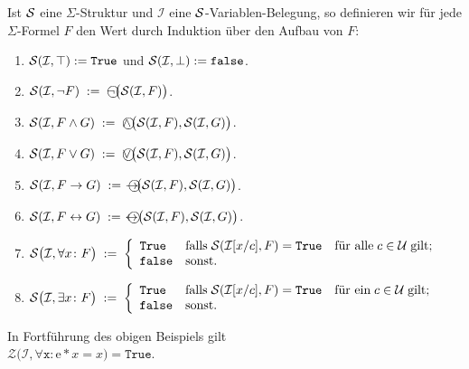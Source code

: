 \begin{Definition}
    Ist $\mathcal{S}$ eine $\Sigma$-Struktur und $\mathcal{I}$ eine $\mathcal{S}$-Variablen-Belegung,
    so definieren wir für jede $\Sigma$-Formel $F$ den Wert 
    durch Induktion über den Aufbau von $F$:
    \begin{enumerate}
    \item $\mathcal{S}(\mathcal{I},\top) := \mathtt{True}$ und $\mathcal{S}(\mathcal{I},\bot) := \mathtt{false}$.
    \item $\struct(\mathcal{I}, \neg F) \;:=\; \circneg\bigl(\struct(\mathcal{I}, F)\bigr)$.
    \item $\struct(\mathcal{I}, F \wedge G) \;:=\; \circwedge\bigl(\struct(\mathcal{I}, F), \struct(\mathcal{I}, G)\bigr)$.
    \item $\struct(\mathcal{I}, F \vee G) \;:=\; \circvee\bigl(\struct(\mathcal{I}, F), \struct(\mathcal{I}, G)\bigr)$.
    \item $\struct(\mathcal{I}, F \rightarrow G) \;:=\; \circright\!\bigl(\struct(\mathcal{I}, F), \struct(\mathcal{I}, G)\bigr)$.
    \item $\struct(\mathcal{I}, F \leftrightarrow G) \;:=\; \circleftright\bigl(\struct(\mathcal{I}, F), \struct(\mathcal{I}, G)\bigr)$.
    \item $\mathcal{S}\bigl(\mathcal{I}, \forall x\colon F\bigr) \;:=\; \left\{
      \begin{array}{ll}
         \mathtt{True}  & \mbox{falls}\; \mathcal{S}(\mathcal{I}[x/c], F) = \mathtt{True}\quad \mbox{für alle}\; c\in \mathcal{U}\;\mbox{gilt}; \\
         \mathtt{false} & \mbox{sonst}.
      \end{array}
      \right.$
    \item $\mathcal{S}\bigl(\mathcal{I}, \exists x \colon F\bigr) \;:=\; \left\{
      \begin{array}{ll}
         \mathtt{True}  & \mbox{falls}\; \mathcal{S}(\mathcal{I}[x/c], F) = \mathtt{True}\quad \mbox{für ein}\; c\in \mathcal{U}\;\mbox{gilt}; \\
         \mathtt{false} & \mbox{sonst}.
      \end{array}
      \right.$\eox    
    \end{enumerate}
\end{Definition}

\example
In Fortführung des obigen Beispiels gilt \\[0.2cm]
\hspace*{1.3cm}  $\mathcal{Z}\bigl(\mathcal{I}, \forall \mathtt{x}: \mathrm{e} * x = x \bigr) = \mathtt{True}$.
\eox

